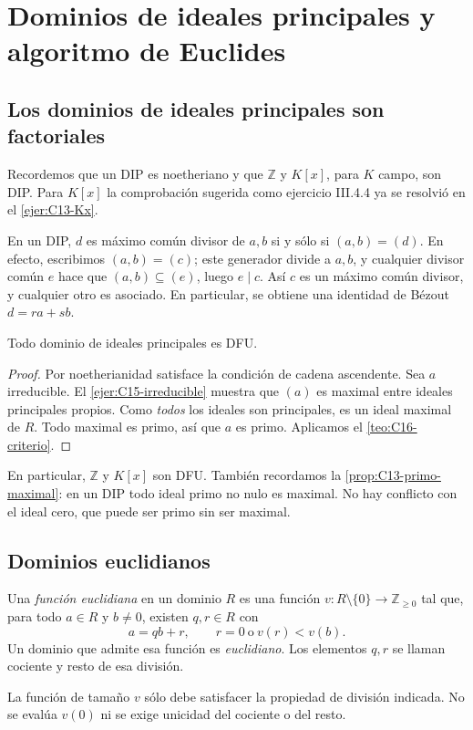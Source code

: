 \section{Dominios de ideales principales y algoritmo de Euclides}\label{sec:anillos-euclidianos}

\subsection{Los dominios de ideales principales son factoriales}\label{tema:16-3-2}
Recordemos que un DIP es noetheriano y que $\mathbb Z$ y $K[x]$, para $K$ campo, son DIP. Para $K[x]$ la comprobación sugerida como ejercicio III.4.4 ya se resolvió en el \cref{ejer:C13-Kx}.

En un DIP, $d$ es máximo común divisor de $a,b$ si y sólo si $(a,b)=(d)$. En efecto, escribimos $(a,b)=(c)$; este generador divide a $a,b$, y cualquier divisor común $e$ hace que $(a,b)\subseteq(e)$, luego $e\mid c$. Así $c$ es un máximo común divisor, y cualquier otro es asociado. En particular, se obtiene una identidad de Bézout $d=ra+sb$.

\begin{prop}\label{prop:C16-DIP}
Todo dominio de ideales principales es DFU.
\end{prop}
\begin{proof}
Por noetherianidad satisface la condición de cadena ascendente. Sea $a$ irreducible. El \cref{ejer:C15-irreducible} muestra que $(a)$ es maximal entre ideales principales propios. Como \emph{todos} los ideales son principales, es un ideal maximal de $R$. Todo maximal es primo, así que $a$ es primo. Aplicamos el \cref{teo:C16-criterio}.
\end{proof}
En particular, $\mathbb Z$ y $K[x]$ son DFU. También recordamos la \cref{prop:C13-primo-maximal}: en un DIP todo ideal primo no nulo es maximal. No hay conflicto con el ideal cero, que puede ser primo sin ser maximal.

\subsection{Dominios euclidianos}\label{tema:16-3-3}
\begin{defi}
Una \emph{función euclidiana} en un dominio $R$ es una función $v:R\setminus\{0\}\to\mathbb Z_{\geq0}$ tal que, para todo $a\in R$ y $b\ne0$, existen $q,r\in R$ con
\[
a=qb+r,\qquad r=0\ \text{o}\ v(r)<v(b).
\]
Un dominio que admite esa función es \emph{euclidiano}. Los elementos $q,r$ se llaman cociente y resto de esa división.
\end{defi}
La función de tamaño $v$ sólo debe satisfacer la propiedad de división indicada. No se evalúa $v(0)$ ni se exige unicidad del cociente o del resto.

